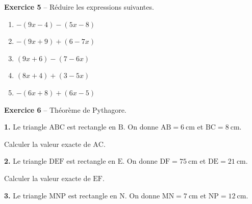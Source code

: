 \documentclass[12pt,a4paper,french]{article}
\begin{document}
\noindent\textbf{Exercice 5} -- Réduire les expressions suivantes.
\begin{enumerate}
\item $-(9x - 4)-(5x - 8)$
\item $-(9x + 9)+(6 - 7x)$
\item $(9x + 6)-(7 - 6x)$
\item $(8x + 4)+(3 - 5x)$
\item $-(6x + 8)+(6x - 5)$
\end{enumerate}
\bigskip

\noindent\textbf{Exercice 6} -- Théorème de Pythagore.
\medskip

\noindent\textbf{1.} Le triangle \ensuremath{\mathrm{A}}\ensuremath{\mathrm{B}}\ensuremath{\mathrm{C}} est rectangle en \ensuremath{\mathrm{B}}. On donne $\ensuremath{\mathrm{A}}\ensuremath{\mathrm{B}} = 6~\text{cm}$ et $\ensuremath{\mathrm{B}}\ensuremath{\mathrm{C}} = 8~\text{cm}$.

\begin{center}
\end{center}

Calculer la valeur exacte de $\ensuremath{\mathrm{A}}\ensuremath{\mathrm{C}}$.

\medskip

\noindent\textbf{2.} Le triangle \ensuremath{\mathrm{D}}\ensuremath{\mathrm{E}}\ensuremath{\mathrm{F}} est rectangle en \ensuremath{\mathrm{E}}. On donne $\ensuremath{\mathrm{D}}\ensuremath{\mathrm{F}} = 75~\text{cm}$ et $\ensuremath{\mathrm{D}}\ensuremath{\mathrm{E}} = 21~\text{cm}$.

\begin{center}
\end{center}

Calculer la valeur exacte de $\ensuremath{\mathrm{E}}\ensuremath{\mathrm{F}}$.

\medskip

\noindent\textbf{3.} Le triangle \ensuremath{\mathrm{M}}\ensuremath{\mathrm{N}}\ensuremath{\mathrm{P}} est rectangle en \ensuremath{\mathrm{N}}. On donne $\ensuremath{\mathrm{M}}\ensuremath{\mathrm{N}} = 7~\text{cm}$ et $\ensuremath{\mathrm{N}}\ensuremath{\mathrm{P}} = 12~\text{cm}$.
\end{document}

